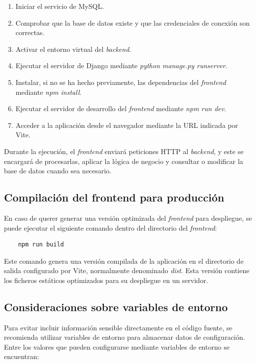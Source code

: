 \begin{enumerate}
	\item Iniciar el servicio de MySQL.
	\item Comprobar que la base de datos existe y que las credenciales de conexión son correctas.
	\item Activar el entorno virtual del \textit{backend}.
	\item Ejecutar el servidor de Django mediante \textit{python manage.py runserver}.
	\item Instalar, si no se ha hecho previamente, las dependencias del \textit{frontend} mediante \textit{npm install}.
	\item Ejecutar el servidor de desarrollo del \textit{frontend} mediante \textit{npm run dev}.
	\item Acceder a la aplicación desde el navegador mediante la URL indicada por Vite.
\end{enumerate}

Durante la ejecución, el \textit{frontend} enviará peticiones HTTP al \textit{backend}, y este se encargará de procesarlas, aplicar la lógica de negocio y consultar o modificar la base de datos cuando sea necesario.

\subsection{Compilación del frontend para producción}

En caso de querer generar una versión optimizada del \textit{frontend} para despliegue, se puede ejecutar el siguiente comando dentro del directorio del \textit{frontend}:

\begin{verbatim}
	npm run build
\end{verbatim}

Este comando genera una versión compilada de la aplicación en el directorio de salida configurado por Vite, normalmente denominado \textit{dist}. Esta versión contiene los ficheros estáticos optimizados para su despliegue en un servidor.

\subsection{Consideraciones sobre variables de entorno}

Para evitar incluir información sensible directamente en el código fuente, se recomienda utilizar variables de entorno para almacenar datos de configuración. Entre los valores que pueden configurarse mediante variables de entorno se encuentran:

